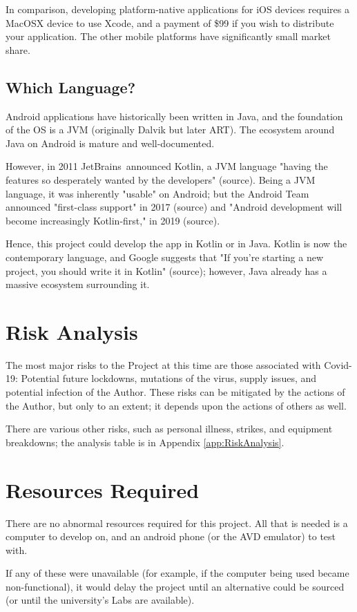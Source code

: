 \documentclass[11pt, a4paper, notitlepage]{report}
\begin{document}
In comparison, developing platform-native applications for iOS devices requires 
a MacOSX device to use Xcode, and a payment of \$99 if you wish to distribute 
your application. The other mobile platforms have significantly small market 
share.

\subsection{Which Language?}
Android applications have historically been written in Java, and the foundation 
of the OS is a JVM (originally Dalvik but later ART). The ecosystem around Java 
on Android is mature and well-documented.

However, in 2011 JetBrains\texttrademark\ announced Kotlin, a JVM language 
"having the features so desperately wanted by the developers" (source). Being a 
JVM language, it was inherently "usable" on Android; but the Android Team 
announced "first-class support" in 2017 (source) and "Android development will 
become increasingly Kotlin-first," in 2019 (source).

Hence, this project could develop the app in Kotlin or in Java. Kotlin is now 
the contemporary language, and Google suggests that "If you’re starting a new 
project, you should write it in Kotlin" (source); however, Java already has a 
massive ecosystem surrounding it.

\section{Risk Analysis}
The most major risks to the Project at this time are those associated with 
Covid-19: Potential future lockdowns, mutations of the virus, supply issues, 
and potential infection of the Author. These risks can be mitigated by the 
actions of the Author, but only to an extent; it depends upon the actions of 
others as well.

There are various other risks, such as personal illness, strikes, and equipment 
breakdowns; the analysis table is in Appendix \ref{app:RiskAnalysis}.

\section{Resources Required}
There are no abnormal resources required for this project. All that is needed 
is a computer to develop on, and an android phone (or the AVD emulator) to test 
with.

If any of these were unavailable (for example, if the computer being used 
became non-functional), it would delay the project until an alternative could 
be sourced (or until the university's Labs are available).
\end{document}

